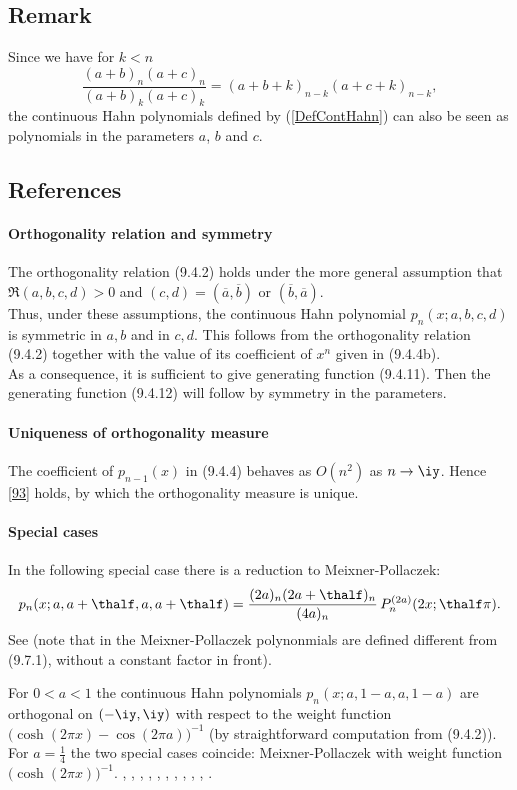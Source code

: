 \documentclass[envcountchap,graybox]{svmono}
\newcounter{rom}
\begin{document}
\subsection*{Remark}
Since we have for $k<n$
$$\frac{(a+b)_n(a+c)_n}{(a+b)_k(a+c)_k}=(a+b+k)_{n-k}(a+c+k)_{n-k},$$
the continuous Hahn polynomials defined by (\ref{DefContHahn}) can also be seen as polynomials
in the parameters $a$, $b$ and $c$.

\subsection*{References}
\label{sec9.4}
%
\paragraph{Orthogonality relation and symmetry}
The orthogonality relation (9.4.2) holds under the more general assumption that
$\Re(a,b,c,d)>0$ and $(c,d)=(\overline a,\overline b)$ or $(\overline b,\overline a)$.\\
Thus, under these assumptions, the continuous Hahn polynomial
$p_n(x;a,b,c,d)$
is symmetric in $a,b$ and in $c,d$.
This follows from the orthogonality relation (9.4.2)
together with the value of its coefficient of $x^n$ given in (9.4.4b).\\
As a consequence, it is sufficient to give generating function (9.4.11). Then the generating
function (9.4.12) will follow by symmetry in the parameters.
%
\paragraph{Uniqueness of orthogonality measure}
The coefficient of $p_{n-1}(x)$ in (9.4.4) behaves as $O(n^2)$ as $n\to\iy$.
Hence \eqref{93} holds, by which the orthogonality measure is unique.
%
\paragraph{Special cases}
In the following special case there is a reduction to
Meixner-Pollaczek:
\begin{equation}
p_n(x;a,a+\thalf,a,a+\thalf)=
\frac{(2a)_n (2a+\thalf)_n}{(4a)_n}\,P_n^{(2a)}(2x;\thalf\pi).
\end{equation}
See  (note that in  the
Meixner-Pollaczek polynonmials are defined different from (9.7.1),
without a constant factor in front).

For $0<a<1$ the continuous Hahn polynomials $p_n(x;a,1-a,a,1-a)$
are orthogonal on $(-\iy,\iy)$ with respect to the weight function
$\big(\cosh(2\pi x)-\cos(2\pi a)\big)^{-1}$
(by straightforward computation from (9.4.2)).
For $a=\tfrac14$ the two special cases coincide:
Meixner-Pollaczek with weight function $\big(\cosh(2\pi x)\big)^{-1}$.
%
\cite{Askey85}, \cite{Askey89I}, \cite{AtakRahmanSuslov},
\cite{AtakSuslov85}, \cite{Badertscher}, \cite{Gupta91}, \cite{Koelink96II},
\cite{Koorn88}, \cite{Lesky94II}, \cite{Lesky95II}, \cite{Lesky97}.
\end{document}
